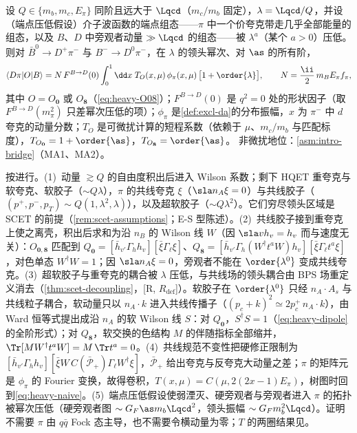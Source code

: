 \begin{theorem}\label{thm:heavy-bdpi}
设 $Q\in\{m_b,m_c,E_\pi\}$ 同阶且远大于 $\Lqcd$（$m_c/m_b$ 固定），$\lambda=\Lqcd/Q$，并设（端点压低假设）介子波函数的端点组态——$\pi$ 中一个价夸克带走几乎全部能量的组态，以及 $B$、$D$ 中旁观者动量 $\gg\Lqcd$ 的组态——被 $\lambda^{a}$（某个 $a>0$）压低。则对 $\bar B^0\to D^+\pi^-$ 与 $B^-\to D^0\pi^-$，在 $\lambda$ 的领头幂次、对 $\as$ 的所有阶，
\begin{equation}\label{eq:heavy-bdpi}
\langle D\pi|O|B\rangle=N\,F^{B\to D}(0)\int_0^1\dd x\;T_O(x,\mu)\,\phi_\pi(x,\mu)\,\big[1+\order{\lambda}\big],\qquad N=\frac{\ii}{2}\,m_BE_\pi f_\pi ,
\end{equation}
其中 $O=O_{\mathbf 0}$ 或 $O_{\mathbf 8}$（\cref{eq:heavy-O08}）；$F^{B\to D}(0)$ 是 $q^2=0$ 处的形状因子（取 $F^{B\to D}(m_\pi^2)$ 只差幂次压低的项）；$\phi_\pi$ 是\cref{def:excl-da}的分布振幅，$x$ 为 $\pi^-$ 中 $d$ 夸克的动量分数；$T_O$ 是可微扰计算的短程系数（依赖于 $\mu$、$m_c/m_b$ 与匹配标度），$T_{O_{\mathbf 0}}=1+\order{\as}$，$T_{O_{\mathbf 8}}=\order{\as}$。
非微扰地位：\cref{asm:intro-bridge}（MA1、MA2）。
\end{theorem}

\begin{proofsketch}
按\cite{BauerPirjolStewart2001}进行。(1)~动量 $\gtrsim Q$ 的自由度积出后进入 Wilson 系数；剩下 HQET 重夸克与软夸克、软胶子（$\sim Q\lambda$），$\pi$ 的共线夸克 $\xi$（$\sla n_A\xi=0$）与共线胶子（$(p^+,p^-,p_T)\sim Q(1,\lambda^2,\lambda)$），以及超软胶子（$\sim Q\lambda^2$）。它们穷尽领头区域是 SCET 的前提（\cref{rem:scet-assumptions}；E-S 型陈述）。(2)~共线胶子接到重夸克上使之离壳，积出后求和为沿 $n_B$ 的 Wilson 线 $W$（因 $\sla vh_v=h_v$ 而与速度无关）：$O_{\mathbf 0,\mathbf 8}$ 匹配到 $Q_{\mathbf 0}=[\bar h_{v'}\Gamma_hh_v][\bar\xi\Gamma_\ell\xi]$、$Q_{\mathbf 8}=[\bar h_{v'}\Gamma_h(W^\dagger t^aW)h_v][\bar\xi\Gamma_\ell t^a\xi]$，对色单态 $W^\dagger W=1$；因 $\sla n_A\xi=0$，旁观者不能在 $\order{\lambda^0}$ 变成共线夸克。(3)~超软胶子与重夸克的耦合被 $\lambda$ 压低，与共线场的领头耦合由 BPS 场重定义消去（\cref{thm:scet-decoupling}，[R, $R_{\mathrm{def}}$]）。软胶子在 $\order{\lambda^0}$ 只经 $n_A\cdot A_s$ 与共线粒子耦合，软动量只以 $n_A\cdot k$ 进入共线传播子（$(p_c+k)^2\simeq2p_c^+\,n_A\cdot k$），由 Ward 恒等式提出成沿 $n_A$ 的软 Wilson 线 $S$：对 $Q_{\mathbf 0}$，$S^\dagger S=1$（\cref{eq:heavy-dipole}的全阶形式）；对 $Q_{\mathbf 8}$，软交换的色结构 $M$ 的伴随指标全部缩并，$\Tr[MW^\dagger t^aW]=M\,\Tr t^a=0$\cite[式~(7)]{BauerPirjolStewart2001}。(4)~共线规范不变性把硬修正限制为 $[\bar h_{v'}\Gamma_hh_v][\bar\xi W\,C(\bar{\mathcal P}_+)\Gamma_\ell W^\dagger\xi]$，$\bar{\mathcal P}_+$ 给出夸克与反夸克大动量之差；$\pi$ 的矩阵元是 $\phi_\pi$ 的 Fourier 变换，故得卷积，$T(x,\mu)=C(\mu,2(2x-1)E_\pi)$，树图时回到\cref{eq:heavy-naive}。(5)~端点压低假设使弱湮灭、硬旁观者与旁观者进入 $\pi$ 的拓扑被幂次压低（硬旁观者图 $\sim G_F\as m_b\Lqcd^2$，领头振幅 $\sim G_Fm_b^2\Lqcd$\cite[式~(26)、(28)]{BenekeEtAl2000}）。证明不需要 $\pi$ 由 $q\bar q$ Fock 态主导，也不需要令横动量为零；$T$ 的两圈结果见\cite{Huber:2016xod}。
\end{proofsketch}

